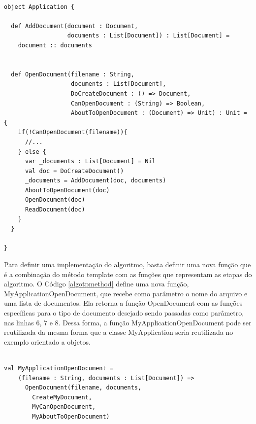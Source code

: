 \begin{lstlisting}[caption={Template Method Funcional.},label=fptpmethod]
    
object Application {

  def AddDocument(document : Document,
                  documents : List[Document]) : List[Document] =
    document :: documents


  def OpenDocument(filename : String,
                   documents : List[Document],
                   DoCreateDocument : () => Document,
                   CanOpenDocument : (String) => Boolean,
                   AboutToOpenDocument : (Document) => Unit) : Unit = {
    if(!CanOpenDocument(filename)){
      //...
    } else {
      var _documents : List[Document] = Nil
      val doc = DoCreateDocument()
      _documents = AddDocument(doc, documents)
      AboutToOpenDocument(doc)
      OpenDocument(doc)
      ReadDocument(doc)
    }
  }

}

\end{lstlisting}

Para definir uma implementação do algoritmo, basta 
definir uma nova função que é a combinação do método 
template com as funções que representam as etapas do 
algoritmo. O Código \ref{algotpmethod} define uma 
nova função, MyApplicationOpenDocument, que recebe 
como parâmetro o nome do arquivo e uma lista de 
documentos. Ela retorna a função OpenDocument com as 
funções específicas para o tipo de documento 
desejado sendo passadas como parâmetro, nas linhas 
6, 7 e 8. Dessa forma, a função MyApplicationOpenDocument 
pode ser reutilizada da mesma forma que a classe 
MyApplication seria reutilizada no exemplo orientado 
a objetos.

\begin{lstlisting}[caption={Definição do algoritmo.},label=algotpmethod]
    
val MyApplicationOpenDocument = 
    (filename : String, documents : List[Document]) => 
      OpenDocument(filename, documents,
        CreateMyDocument,
        MyCanOpenDocument,
        MyAboutToOpenDocument)

\end{lstlisting}

